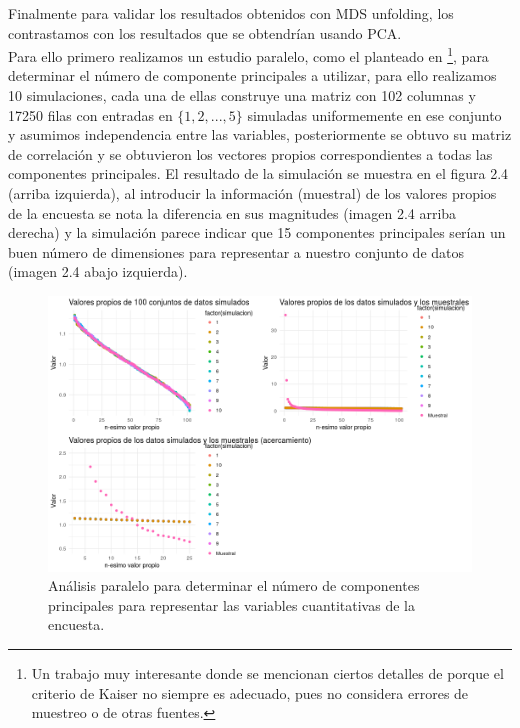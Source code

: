 \documentclass[paper=letter, fontsize=11pt]{scrartcl}
\numberwithin{equation}{section} %
\numberwithin{figure}{section} %
\numberwithin{table}{section} %
\begin{document}
Finalmente para validar los resultados obtenidos con MDS unfolding, los contrastamos con los resultados que se obtendrían usando PCA.\\


Para ello primero realizamos un estudio paralelo, como el planteado en \cite{Parallel}\footnote{Un trabajo muy interesante  donde se mencionan ciertos detalles de porque el criterio de Kaiser no siempre es adecuado, pues no considera errores de muestreo o de otras fuentes.}, para determinar el número de componente principales a utilizar, para ello realizamos 10 simulaciones, cada una de ellas construye una matriz con 102 columnas y 17250 filas con entradas en $\{1,2,...,5\}$ simuladas uniformemente en ese conjunto y asumimos independencia entre las variables, posteriormente se obtuvo su matriz de correlación y se obtuvieron los vectores propios correspondientes a todas las componentes principales. El resultado de la simulación se muestra en el figura 2.4 (arriba izquierda), al introducir la información (muestral) de los valores propios de la encuesta se nota la diferencia en sus magnitudes (imagen 2.4 arriba derecha) y la simulación parece indicar que 15 componentes principales serían un buen número de dimensiones para representar a nuestro conjunto de datos (imagen 2.4 abajo izquierda).

 

\begin{figure}[H]
  \begin{center}
    \includegraphics[scale=0.45]{pca_n.png}
    \caption{Análisis paralelo para determinar el número de componentes principales para representar las variables cuantitativas de la encuesta.}
    \label{figura2_4}
  \end{center}
\end{figure}
\end{document}

